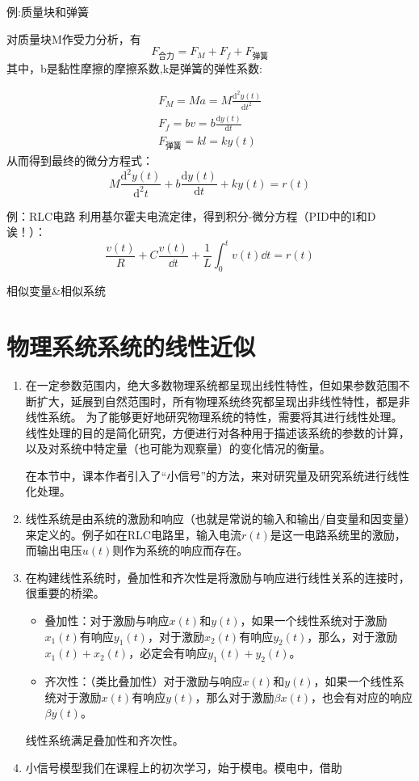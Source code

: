 \documentclass{NHNotebook}
\begin{document}
例:质量块和弹簧

对质量块M作受力分析，有$$F_{\displaystyle{\mbox{合力}}}=F_{M}+F_{f}+F_{\mbox{弹簧}}$$
其中，b是黏性摩擦的摩擦系数,k是弹簧的弹性系数:

\begin{gather*}
    F_{M}=Ma=M \frac{\mathrm{d}^2y(t)}{\mathrm{d}t^2}\\
    F_f=bv=b\frac{\mathrm{d}y(t)}{\mathrm{d}t}\\
    F_{\mbox{弹簧}}=kl=ky(t)
\end{gather*}
从而得到最终的微分方程式：
\[
   M\frac{\mathrm{d}^2y(t)}{\mathrm{d}^2t}+b\frac{\mathrm{d}y(t)}{\mathrm{d}t}+ky(t)=r(t)
\]

例：RLC电路
利用基尔霍夫电流定律，得到积分-微分方程（PID中的I和D诶！）：
\[
    \frac{v(t)}{R}+C\frac{v(t)}{\dd t}+\frac{1}{L}\int_{0}^{t}v(t)\dd t=r(t)   
\]

相似变量\&相似系统

\section{物理系统系统的线性近似}
\begin{enumerate}
    \item 在一定参数范围内，绝大多数物理系统都呈现出线性特性，但如果参数范围不断扩大，延展到自然范围时，所有物理系统终究都呈现出非线性特性，都是非线性系统。
    为了能够更好地研究物理系统的特性，需要将其进行线性处理。线性处理的目的是简化研究，方便进行对各种用于描述该系统的参数的计算，以及对系统中特定量（也可能为观察量）的变化情况的衡量。

    在本节中，课本作者引入了“小信号”的方法，来对研究量及研究系统进行线性化处理。
    \item 线性系统是由系统的激励和响应（也就是常说的输入和输出/自变量和因变量）来定义的。例子如在RLC电路里，输入电流$r(t)$是这一电路系统里的激励，而输出电压$u(t)$则作为系统的响应而存在。
    \item 在构建线性系统时，叠加性和齐次性是将激励与响应进行线性关系的连接时，很重要的桥梁。
    \begin{itemize}
        \item 叠加性：对于激励与响应$x(t)$和$y(t)$，如果一个线性系统对于激励$x_1(t)$有响应$y_1(t)$，对于激励$x_2(t)$有响应$y_2(t)$，那么，对于激励$x_1(t)+x_2(t)$，必定会有响应$y_1(t)+y_2(t)$。
        \item 齐次性：（类比叠加性）对于激励与响应$x(t)$和$y(t)$，如果一个线性系统对于激励$x(t)$有响应$y(t)$，那么对于激励$\beta x(t)$，也会有对应的响应$\beta y(t)$。
    \end{itemize}
    \begin{tcolorbox}[reset]
        线性系统满足叠加性和齐次性。
    \end{tcolorbox}
    \item 小信号模型我们在课程上的初次学习，始于模电。模电中，借助
\end{enumerate}
\end{document}
